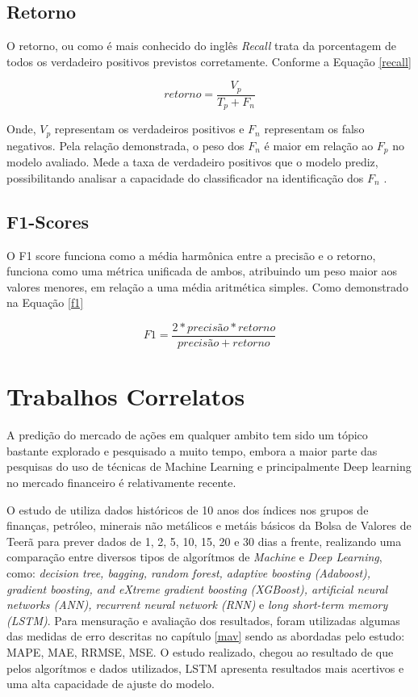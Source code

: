 \subsection{Retorno}

O retorno, ou como é mais conhecido do inglês \emph{Recall} trata da porcentagem de todos os verdadeiro positivos previstos corretamente. Conforme a Equação \ref{recall}

\begin{equation}
\label{recall}
    retorno = \frac{V_p}{T_p + F_n}
\end{equation}

Onde, {$V_p$} representam os verdadeiros positivos e {$F_n$} representam os falso negativos. Pela relação demonstrada, o peso dos {$F_n$} é maior em relação ao {$F_p$} no modelo avaliado. Mede a taxa de verdadeiro positivos que o modelo prediz, possibilitando analisar a capacidade do classificador na identificação dos {$F_n$} \cite{ma3}.
 
\subsection{F1-Scores}

O F1 score funciona como a média harmônica entre a precisão e o retorno, funciona como uma métrica unificada de ambos, atribuindo um peso maior aos valores menores, em relação a uma média aritmética simples. Como demonstrado na Equação \ref{f1}  

\begin{equation}
\label{f1}
    F1 = \frac{2 * precisão * retorno}{precisão + retorno}
\end{equation}

\section{Trabalhos Correlatos}
\label{tc}

A predição do mercado de ações em qualquer ambito tem sido um tópico bastante explorado e pesquisado a muito tempo, embora a maior parte das pesquisas do uso de técnicas de Machine Learning e principalmente Deep learning no mercado financeiro é relativamente recente. 

O estudo de \cite{rna3} utiliza dados históricos de 10 anos dos índices nos grupos de finanças, petróleo, minerais não metálicos e metáis básicos da Bolsa de Valores de Teerã para prever dados de 1, 2, 5, 10, 15, 20 e 30 dias a frente, realizando uma comparação entre diversos tipos de algorítmos de \emph{Machine} e \emph{Deep Learning}, como: \emph{decision tree, bagging, random forest, adaptive boosting (Adaboost), gradient boosting, and eXtreme gradient boosting (XGBoost), artificial neural networks (ANN), recurrent neural network (RNN)} e \emph{long short-term memory (LSTM)}. Para mensuração e avaliação dos resultados, foram utilizadas algumas das medidas de erro descritas no capítulo \ref{mav} sendo as abordadas pelo estudo: MAPE, MAE, RRMSE, MSE. O estudo realizado, chegou ao resultado de que pelos algorítmos e dados utilizados, LSTM apresenta resultados mais acertivos e uma alta capacidade de ajuste do modelo. 

